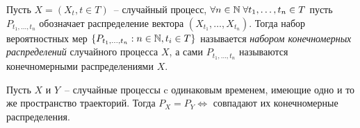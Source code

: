 \begin{definition}
Пусть $X = (X_t, t \in T)$~--  случайный процесс, $\forall n \in \mathbb{N} \;
\forall t_1, \dots, t_n \in T$
пусть $P_{t_1, \dots, t_n}$ обозначает распределение вектора $(X_{t_1}, \dots, X_{t_n})$.
Тогда набор вероятностных мер $\{P_{t_1, \dots, t_n}: n \in \mathbb{N}, t_i \in T\}$
называется \emph{набором конечномерных распределений} случайного процесса $X$, а сами
$P_{t_1, \dots, t_n}$ называются конечномерными распределениями $X$.
\end{definition}


\begin{lem}
Пусть $X$ и $Y$~-- случайные процессы c одинаковым временем, имеющие одно и то же пространство
траекторий. Тогда $P_X = P_Y \Leftrightarrow$ совпадают их конечномерные распределения.
\end{lem}


